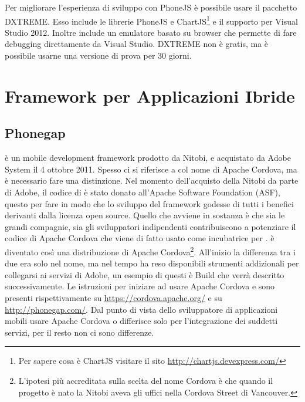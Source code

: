             Per migliorare l'esperienza di sviluppo con PhoneJS è possibile usare
            il pacchetto DXTREME. Esso include le librerie PhoneJS e
            ChartJS\footnote{Per sapere cosa è ChartJS visitare il sito
            \url{http://chartjs.devexpress.com/}} e il
            supporto per Visual Studio 2012. Inoltre include un emulatore basato
            su browser che permette di fare debugging direttamente da Visual Studio.
            DXTREME non è gratis, ma è possibile usarne una versione di prova per
            30 giorni.

    \section{Framework per Applicazioni Ibride}
    \label{sec:frameworkhybrid}
        \subsection{Phonegap}
        \label{subsec:hybridpg}
            \pg{} è un mobile development frame\-work prodotto da Nitobi, e
            acquistato da Adobe System il 4 ottobre 2011.
            Spesso ci si riferisce a \pg{} col nome di Apache Cordova, ma è
            necessario fare una distinzione.
            Nel momento dell'acquisto della Nitobi da parte di Adobe, il codice
            di \pg{} è stato donato all'Apache Software Foundation (ASF),
            questo per fare in modo che lo sviluppo del frame\-work godesse di
            tutti i benefici derivanti dalla licenza open \mbox{source}.
            Quello che avviene in sostanza è che sia le grandi compagnie, sia
            gli sviluppatori indipendenti contribuiscono a potenziare il codice
            di Apache Cordova che viene di fatto usato come incubatrice per
            \pg{}.
            \pg{} è diventato così una distribuzione di Apache Cordova\footnote{
            L'ipotesi più accreditata sulla scelta del nome Cordova
            è che quando il progetto \pg{} è nato la Nitobi aveva gli uffici
            nella Cordova Street di Vancouver.}. All'inizio la differenza tra
            i due era solo nel nome, ma nel tempo \pg{} ha reso disponibili
            strumenti addizionali per collegarsi ai servizi di Adobe, un esempio
            di questi è \pg{} Build che verrà
            descritto successivamente. Le istruzioni per iniziare ad usare
            Apache Cordova e \pg{} sono presenti rispettivamente su
            \url{https://cordova.apache.org/} e su
            \url{http://phonegap.com/}. Dal punto di vista dello sviluppatore di
            applicazioni mobili usare Apache Cordova o \pg{} differisce solo
            per l'integrazione dei suddetti servizi, per il resto non ci sono
            differenze.

